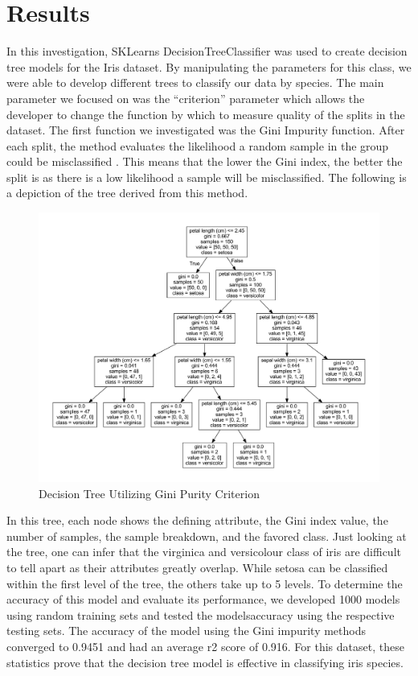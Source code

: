 \documentclass[journal]{IEEEtran}
\begin{document}
\section{Results}

In this investigation, SKLearn\textquotesingle s DecisionTreeClassifier was used to create decision tree models for the Iris dataset. By manipulating the parameters for this class, we were able to develop different trees to classify our data by species. The main parameter we focused on was the “criterion” parameter which allows the developer to change the function by which to measure quality of the splits in the dataset. The first function we investigated was the Gini Impurity function. After each split, the method evaluates the likelihood a random sample in the group could be misclassified \cite{b2}. This means that the lower the Gini index, the better the split is as there is a low likelihood a sample will be misclassified. The following is a depiction of the tree derived from this method.

\begin{figure}[h!]
\includegraphics[scale=.25]{iris.pdf}
\centering
\caption{Decision Tree Utilizing Gini Purity Criterion}
\end{figure}

In this tree, each node shows the defining attribute, the Gini index value, the number of samples, the sample breakdown, and the favored class. Just looking at the tree, one can infer that the virginica and versicolour class of iris are difficult to tell apart as their attributes greatly overlap. While setosa can be classified within the first level of the tree, the others take up to 5 levels. To determine the accuracy of this model and evaluate its performance, we developed 1000 models using random training sets and tested the models\textquotesingle accuracy using the respective testing sets. The accuracy of the model using the Gini impurity methods converged to 0.9451 and had an average r2 score of 0.916. For this dataset, these statistics prove that the decision tree model is effective in classifying iris species. 
\end{document}

